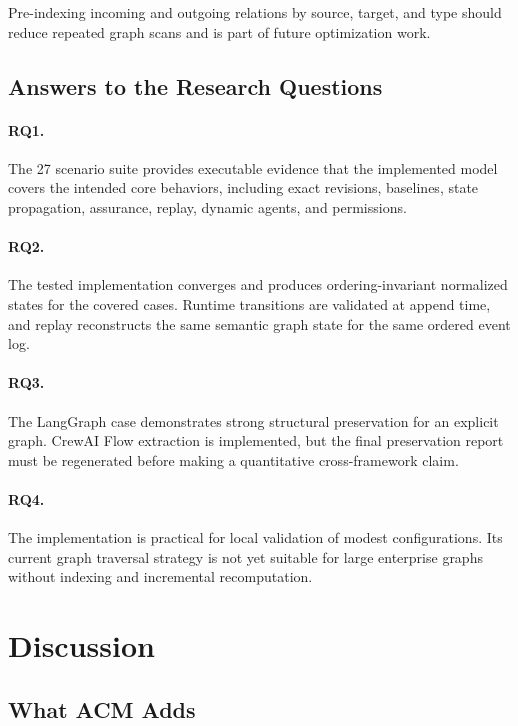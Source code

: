 \documentclass[10pt]{article}
\begin{document}
Pre-indexing incoming and outgoing relations by source, target, and type should reduce repeated graph scans and is part of future optimization work.

\subsection{Answers to the Research Questions}

\paragraph{RQ1.}
The 27 scenario suite provides executable evidence that the implemented model covers the intended core behaviors, including exact revisions, baselines, state propagation, assurance, replay, dynamic agents, and permissions.

\paragraph{RQ2.}
The tested implementation converges and produces ordering-invariant normalized states for the covered cases. Runtime transitions are validated at append time, and replay reconstructs the same semantic graph state for the same ordered event log.

\paragraph{RQ3.}
The LangGraph case demonstrates strong structural preservation for an explicit graph. CrewAI Flow extraction is implemented, but the final preservation report must be regenerated before making a quantitative cross-framework claim.

\paragraph{RQ4.}
The implementation is practical for local validation of modest configurations. Its current graph traversal strategy is not yet suitable for large enterprise graphs without indexing and incremental recomputation.

\section{Discussion}
\label{sec:discussion}

\subsection{What ACM Adds}
\end{document}
